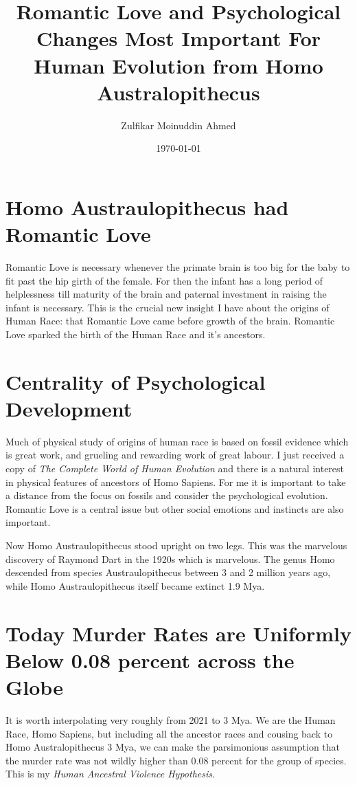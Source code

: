 \documentclass{amsart}
\title{Romantic Love and Psychological Changes Most Important For Human Evolution from Homo Australopithecus}
\author{Zulfikar Moinuddin Ahmed}
\date{\today}
\begin{document}
\maketitle

\section{Homo Austraulopithecus had Romantic Love}

Romantic Love is necessary whenever the primate brain is too big for the baby to fit past the hip girth of the female.  For then the infant has a long period of helplessness till maturity of the brain and paternal investment in raising the infant is necessary.  This is the crucial new insight I have about the origins of Human Race: that Romantic Love came before growth of the brain.  Romantic Love sparked the birth of the Human Race and it's ancestors.

\section{Centrality of Psychological Development}

Much of physical study of origins of human race is based on fossil evidence which is great work, and grueling and rewarding work of great labour.  I just received a copy of {\em The Complete World of Human Evolution} and there is a natural interest in physical features of ancestors of Homo Sapiens.  For me it is important to take a distance from the focus on fossils and consider the psychological evolution.  Romantic Love is a central issue but other social emotions and instincts are also important.  

Now Homo Austraulopithecus stood upright on two legs.  This was the marvelous discovery of Raymond Dart in the 1920s which is marvelous.  The genus Homo descended from species Austraulopithecus between 3 and 2 million years ago, while Homo Austraulopithecus itself became extinct 1.9 Mya.
  

\section{Today Murder Rates are Uniformly Below 0.08 percent across the Globe}

It is worth interpolating very roughly from 2021 to 3 Mya. We are the Human Race, Homo Sapiens, but including all the ancestor races and cousing back to Homo Australopithecus 3 Mya, we can make the parsimonious assumption that the murder rate was not wildly higher than 0.08 percent for the group of species.  This is my {\em Human Ancestral Violence Hypothesis}.  
\end{document}
